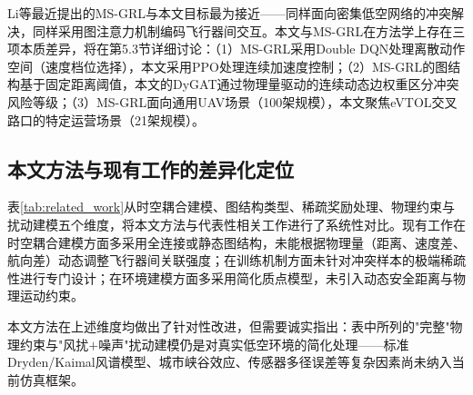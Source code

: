 \documentclass[12pt,a4paper,UTF8]{ctexart}
\begin{document}
Li等最近提出的MS-GRL\cite{ref24}与本文目标最为接近——同样面向密集低空网络的冲突解决，同样采用图注意力机制编码飞行器间交互。本文与MS-GRL在方法学上存在三项本质差异，将在第5.3节详细讨论：（1）MS-GRL采用Double DQN处理离散动作空间（速度档位选择），本文采用PPO处理连续加速度控制；（2）MS-GRL的图结构基于固定距离阈值，本文的DyGAT通过物理量驱动的连续动态边权重区分冲突风险等级；（3）MS-GRL面向通用UAV场景（100架规模），本文聚焦eVTOL交叉路口的特定运营场景（21架规模）。

\subsection{本文方法与现有工作的差异化定位}

表\ref{tab:related_work}从时空耦合建模、图结构类型、稀疏奖励处理、物理约束与扰动建模五个维度，将本文方法与代表性相关工作进行了系统性对比。现有工作在时空耦合建模方面多采用全连接或静态图结构，未能根据物理量（距离、速度差、航向差）动态调整飞行器间关联强度；在训练机制方面未针对冲突样本的极端稀疏性进行专门设计；在环境建模方面多采用简化质点模型，未引入动态安全距离与物理运动约束。

本文方法在上述维度均做出了针对性改进，但需要诚实指出：表中所列的"完整"物理约束与"风扰$+$噪声"扰动建模仍是对真实低空环境的简化处理——标准Dryden/Kaimal风谱模型、城市峡谷效应、传感器多径误差等复杂因素尚未纳入当前仿真框架。

\begin{table}[H]
    \centering
    \caption{本文方法与代表性相关工作的系统性对比}
    \label{tab:related_work}
\end{table}
\end{document}
